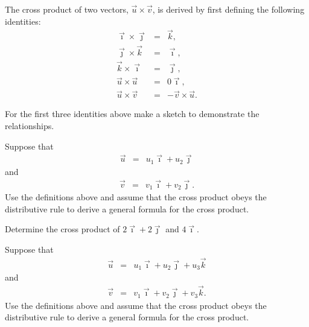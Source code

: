\begin{problem}
\item The cross product of two vectors, $\vec{u}\times\vec{v}$, is
  derived by first defining  the following identities:
  \begin{eqnarray*}
    \vec{\imath} \times \vec{\jmath} & = & \vec{k}, \\
    \vec{\jmath} \times \vec{k} & = & \vec{\imath}, \\
    \vec{k} \times \vec{\imath} & = & \vec{\jmath}, \\
    \vec{u} \times \vec{u} & = & 0 \vec{\imath}, \\
    \vec{u} \times \vec{v} & = & - \vec{v} \times \vec{u}.
  \end{eqnarray*}
  \begin{subproblem}
  \item For the first three identities above make a sketch to
    demonstrate the relationships.
    \vfill

    \clearpage

  \item Suppose that
    \begin{eqnarray*}
      \vec{u} & = & u_1 \vec{\imath} + u_2 \vec{\jmath}
    \end{eqnarray*}
    and
    \begin{eqnarray*}
      \vec{v} & = & v_1 \vec{\imath} + v_2 \vec{\jmath}.
    \end{eqnarray*}
    Use the definitions above and assume that the cross product obeys
    the distributive rule to derive a general formula for the cross
    product.
    \vfill
    \vfill

  \item Determine the cross product of $2 \vec{\imath} + 2\vec{\jmath}$ and $4 \vec{\imath}$.
    \vfill

    \clearpage

  \item Suppose that
    \begin{eqnarray*}
      \vec{u} & = & u_1 \vec{\imath} + u_2 \vec{\jmath} + u_3 \vec{k}
    \end{eqnarray*}
    and
    \begin{eqnarray*}
      \vec{v} & = & v_1 \vec{\imath} + v_2 \vec{\jmath} + v_3 \vec{k}.
    \end{eqnarray*}
    Use the definitions above and assume that the cross product obeys
    the distributive rule to derive a general formula for the cross product.
    \vfill

  \end{subproblem}
\end{problem}


